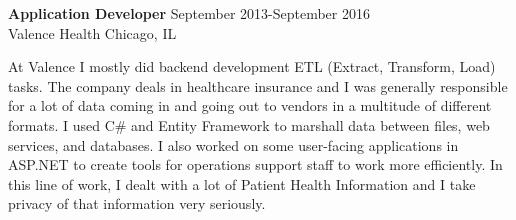 \textbf{Application Developer} \hfill September 2013-September 2016 \\
Valence Health \hfill Chicago, IL
\begin{description}  \itemsep -2pt %
\item At Valence I mostly did backend development ETL (Extract,
Transform, Load) tasks. The company deals in healthcare insurance and I
was generally responsible for a lot of data coming in and going out to
vendors in a multitude of different formats. I used C\# and Entity
Framework to marshall data between files, web services, and databases.
I also worked on some user-facing applications in ASP.NET
to create tools for operations support staff to work more efficiently.
In this line of work, I dealt with a lot of Patient Health Information
and I take privacy of that information very seriously.
\end{description}

